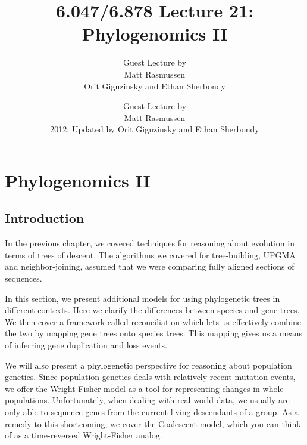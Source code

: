 \ifdefined\isstandalone
\title{6.047/6.878 Lecture 21: Phylogenomics II {\tmabbr{}}}
\author{Guest Lecture by\\
  Matt Rasmussen \\
  Orit Giguzinsky and Ethan Sherbondy}
\maketitle
{}
\lhead{}
\rhead{}
{\pagebreak}
{\tableofcontents}
{\pagebreak}
{\listoffigures}
\else
\chapter{Phylogenomics II}
\author{Guest Lecture by\\
  Matt Rasmussen \\
  2012: Updated by Orit Giguzinsky and Ethan Sherbondy}
\lhead{} 
\rhead{} 
\minilof
\fi 
\pagestyle{fancy} 

\ifdefined\isstandalone
\def\@mydir{images} 
\fi
\ifdefined\ischapter
\def\@mydir{../Lecture21_Phylogenomics/images} 
\fi 
\ifdefined\ismaster
\def\@mydir{Lecture21_Phylogenomics/images} 
\fi 
\section{Introduction}

In the previous chapter, we covered techniques for reasoning about evolution in terms of trees of descent. The algorithms we covered for tree-building, UPGMA and neighbor-joining, assumed that we were comparing fully aligned sections of sequences.

In this section, we present additional models for using phylogenetic trees in different contexts. Here we clarify the differences between species and gene trees. We then cover a framework called reconciliation which lets us effectively combine the two by mapping gene trees onto species trees. This mapping gives us a means of inferring gene duplication and loss events.

We will also present a phylogenetic perspective for reasoning about population genetics. Since population genetics deals with relatively recent mutation events, we offer the Wright-Fisher model as a tool for representing changes in whole populations. Unfortunately, when dealing with real-world data, we usually are only able to sequence genes from the current living descendants of a group. As a remedy to this shortcoming, we cover the Coalescent model, which you can think of as a time-reversed Wright-Fisher analog.

